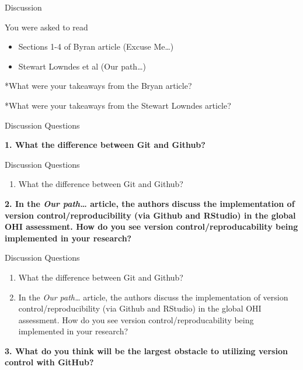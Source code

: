 \documentclass[
  ignorenonframetext,
]{beamer}
\providecommand{\tightlist}{%
  \setlength{\itemsep}{0pt}\setlength{\parskip}{0pt}}
\begin{document}
\begin{frame}{Discussion}
\protect\hypertarget{discussion}{}

You were asked to read

\begin{itemize}
\tightlist
\item
  Sections 1-4 of Byran article (Excuse Me\ldots{})
\item
  Stewart Lowndes et al (Our path\ldots{})
\end{itemize}

*What were your takeaways from the Bryan article?

*What were your takeaways from the Stewart Lowndes article?

\end{frame}

\begin{frame}{Discussion Questions}
\protect\hypertarget{discussion-questions}{}

\textbf{1. What the difference between Git and Github?}

\end{frame}

\begin{frame}{Discussion Questions}
\protect\hypertarget{discussion-questions-1}{}

\begin{enumerate}
\tightlist
\item
  What the difference between Git and Github?
\end{enumerate}

\textbf{2. In the \emph{Our path\ldots{}} article, the authors discuss
the implementation of version control/reproducibility (via Github and
RStudio) in the global OHI assessment. How do you see version
control/reproducability being implemented in your research?}

\end{frame}

\begin{frame}{Discussion Questions}
\protect\hypertarget{discussion-questions-2}{}

\begin{enumerate}
\item
  What the difference between Git and Github?
\item
  In the \emph{Our path\ldots{}} article, the authors discuss the
  implementation of version control/reproducibility (via Github and
  RStudio) in the global OHI assessment. How do you see version
  control/reproducability being implemented in your research?
\end{enumerate}

\textbf{3. What do you think will be the largest obstacle to utilizing
version control with GitHub?}

\end{frame}
\end{document}
